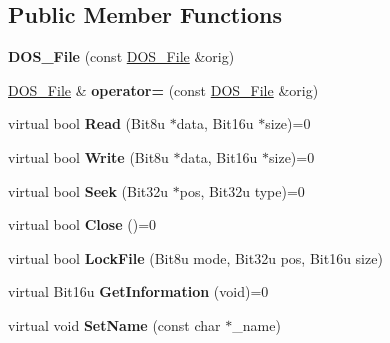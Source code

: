 \subsection*{Public Member Functions}
\begin{DoxyCompactItemize}
\item 
\hypertarget{classDOS__File_a1963c62fce9c71c29c5ce6596545a66f}{{\bfseries D\-O\-S\-\_\-\-File} (const \hyperlink{classDOS__File}{D\-O\-S\-\_\-\-File} \&orig)}\label{classDOS__File_a1963c62fce9c71c29c5ce6596545a66f}

\item 
\hypertarget{classDOS__File_a083eb382cd14b00d9145bfa4bd50cb67}{\hyperlink{classDOS__File}{D\-O\-S\-\_\-\-File} \& {\bfseries operator=} (const \hyperlink{classDOS__File}{D\-O\-S\-\_\-\-File} \&orig)}\label{classDOS__File_a083eb382cd14b00d9145bfa4bd50cb67}

\item 
\hypertarget{classDOS__File_aeebb41f3002ca630c8fb29575295a110}{virtual bool {\bfseries Read} (Bit8u $\ast$data, Bit16u $\ast$size)=0}\label{classDOS__File_aeebb41f3002ca630c8fb29575295a110}

\item 
\hypertarget{classDOS__File_a0d8f5391f10d80c2cee32906addcec3b}{virtual bool {\bfseries Write} (Bit8u $\ast$data, Bit16u $\ast$size)=0}\label{classDOS__File_a0d8f5391f10d80c2cee32906addcec3b}

\item 
\hypertarget{classDOS__File_a1698a73219cb9addf47c62cd33c56d5b}{virtual bool {\bfseries Seek} (Bit32u $\ast$pos, Bit32u type)=0}\label{classDOS__File_a1698a73219cb9addf47c62cd33c56d5b}

\item 
\hypertarget{classDOS__File_a69cb82dd341a8a126478c2e6235c0805}{virtual bool {\bfseries Close} ()=0}\label{classDOS__File_a69cb82dd341a8a126478c2e6235c0805}

\item 
\hypertarget{classDOS__File_afd1adec0fa0e51a83d5f47b4be21d890}{virtual bool {\bfseries Lock\-File} (Bit8u mode, Bit32u pos, Bit16u size)}\label{classDOS__File_afd1adec0fa0e51a83d5f47b4be21d890}

\item 
\hypertarget{classDOS__File_a3956bfb846f17650612c7665f0226c9c}{virtual Bit16u {\bfseries Get\-Information} (void)=0}\label{classDOS__File_a3956bfb846f17650612c7665f0226c9c}

\item 
\hypertarget{classDOS__File_ac6844051553dcd169d68cb52a2b7da7d}{virtual void {\bfseries Set\-Name} (const char $\ast$\-\_\-name)}\label{classDOS__File_ac6844051553dcd169d68cb52a2b7da7d}


\end{DoxyCompactItemize}
